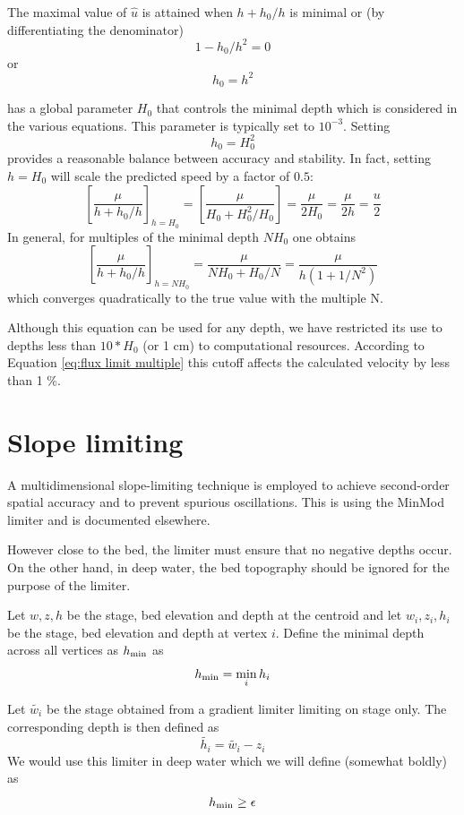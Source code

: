 \documentclass{manual}
\begin{document}
The maximal value of $\hat{u}$ is attained when $h+h_0/h$ is minimal or (by differentiating the denominator)
\[
  1 - h_0/h^2 = 0
\]
or
\[
  h_0 = h^2
\]

\anuga has a global parameter $H_0$ that controls the minimal depth which
is considered in the various equations. This parameter is typically set to
$10^{-3}$. Setting
\[
  h_0 = H_0^2
\]
provides a reasonable balance between accuracy and stability. In fact,
setting $h=H_0$ will scale the predicted speed by a factor of $0.5$:
\[
  \left[ \frac{\mu}{h + h_0/h} \right]_{h = H_0} = 
  \left[ \frac{\mu}{H_0 + H_0^2/H_0} \right] = 
  \frac{\mu}{2 H_0} = \frac{\mu}{2 h} = \frac{u}{2} 
\]
In general, for multiples of the minimal depth $N H_0$ one obtains
\begin{equation}
  \left[ \frac{\mu}{h + h_0/h} \right]_{h = N H_0} =
  \frac{\mu}{N H_0 + H_0/N} =   
  \frac{\mu}{h (1 + 1/N^2)} 
  \label{eq:flux limit multiple} 
\end{equation} 
which converges quadratically to the true value with the multiple N.

Although this equation can be used for any depth, we have restricted its use to depths less than $10 * H_0$ (or 1 cm) to computational resources.  
According to Equation \ref{eq:flux limit multiple} this cutoff    
affects the calculated velocity by less than 1 \%. 



\section{Slope limiting}
A multidimensional slope-limiting technique is employed to achieve second-order spatial
accuracy and to prevent spurious oscillations. This is using the MinMod limiter and is
documented elsewhere.

However close to the bed, the limiter must ensure that no negative depths occur.
 On the other hand, in deep water, the bed topography should be ignored for the
purpose of the limiter.

Let $w, z, h$  be the stage, bed elevation and depth at the centroid and
let $w_i, z_i, h_i$ be the stage, bed elevation and depth at vertex $i$.
Define the minimal depth across all vertices as $h_{\min}$ as
\[
  h_{\min} = \min_i h_i
\]

Let $\tilde{w_i}$ be the stage obtained from a gradient limiter
limiting on stage only. The corresponding depth is then defined as
\[
  \tilde{h_i} = \tilde{w_i} - z_i
\]
We would use this limiter in deep water which we will define (somewhat boldly)
as
\[
  h_{\min} \ge \epsilon
\]
\end{document}
